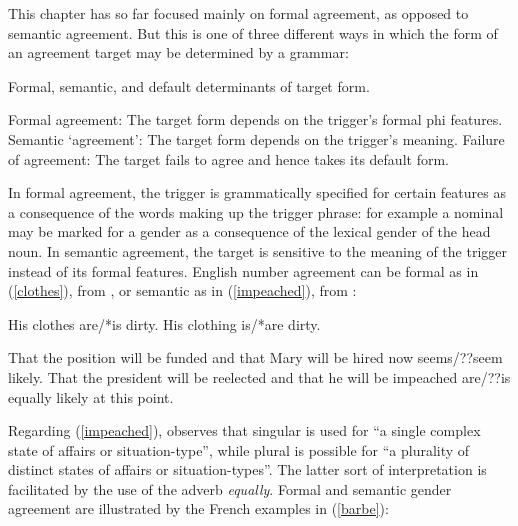 \documentclass[output=paper
                ,modfonts
                ,nonflat
	        ,collection
	        ,collectionchapter
	        ,collectiontoclongg
 	        ,biblatex
                ,babelshorthands
                ,newtxmath
                ,draftmode
                ,colorlinks, citecolor=brown
]{./langsci/langscibook}
\begin{document}
{This chapter has so far focused mainly on formal agreement, as opposed to semantic agreement.   But this is one of three different ways in which the form of an agreement target may be determined by a grammar:	

\begin{exe}
\ex   Formal, semantic, and default determinants of target form. 
\begin{xlist}
\ex	Formal agreement: The target form depends on the trigger's formal phi features.
\ex	Semantic `agreement’: The target form depends on the trigger's meaning.
\ex	Failure of agreement: The target fails to agree and hence takes its default form.
\end{xlist}
\end{exe}

\noindent
 In formal agreement, the trigger is grammatically specified for certain features as a consequence of the words making up the trigger phrase: for example a nominal may be marked for a gender as a consequence of the lexical gender of the head noun.  In semantic agreement, the target is sensitive to the meaning of the trigger instead of its formal features.  English number agreement can be formal as in (\ref{clothes}), from \citet[92]{Wechsler:2013}, or semantic as in (\ref{impeached}), from \citet[92]{Mccloskey:1991}:

\begin{exe} 
\ex \label{clothes}
 \begin{xlist}
\ex   His clothes are/*is dirty.
\ex   His clothing is/*are dirty.
\end{xlist}
\end{exe}

\begin{exe} 
\ex \label{impeached}
 \begin{xlist}
\ex   That the position will be funded and that Mary will be hired now seems/??seem likely.
\ex  	That the president will be reelected and that he will be impeached are/??is equally likely at this point.
\end{xlist}
\end{exe}

\noindent
Regarding (\ref{impeached}), \citet[564--565]{Mccloskey:1991} observes that singular is used for ``a single complex state of affairs or situation-type'', while plural is possible for ``a plurality of distinct states of affairs or situation-types''.  The latter sort of interpretation is facilitated by the use of the adverb \textit{equally}.   Formal and semantic gender agreement are illustrated by the French examples in (\ref{barbe}):

}
\end{document}
